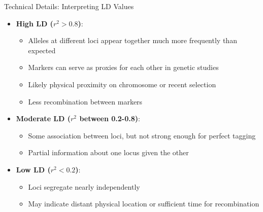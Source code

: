 \begin{frame}{Technical Details: Interpreting LD Values}

\begin{itemize}
\item \textbf{High LD ($r^2 > 0.8$)}:
\begin{itemize}
\item Alleles at different loci appear together much more frequently than expected
\item Markers can serve as proxies for each other in genetic studies
\item Likely physical proximity on chromosome or recent selection
\item Less recombination between markers
\end{itemize}
\end{itemize}

\begin{itemize}
\item \textbf{Moderate LD ($r^2$ between 0.2-0.8)}:
\begin{itemize}
\item Some association between loci, but not strong enough for perfect tagging
\item Partial information about one locus given the other
\end{itemize}
\end{itemize}

\begin{itemize}
\item \textbf{Low LD ($r^2 < 0.2$)}:
\begin{itemize}
\item Loci segregate nearly independently
\item May indicate distant physical location or sufficient time for recombination
\end{itemize}
\end{itemize}

\end{frame}

